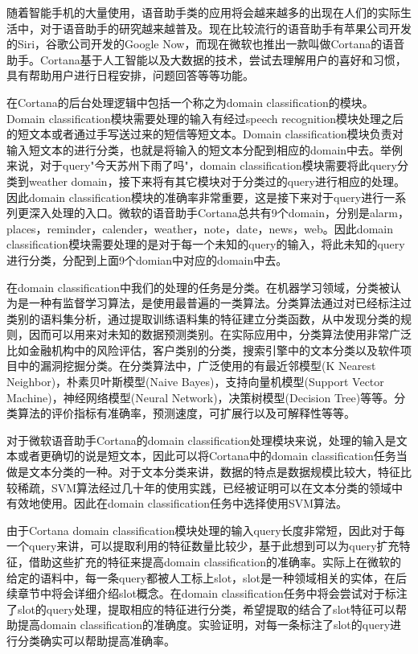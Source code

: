 \documentclass[master]{njuthesis}
\begin{document}
    随着智能手机的大量使用，语音助手类的应用将会越来越多的出现在人们的实际生活中，对于语音助手的研究越来越普及。现在比较流行的语音助手有苹果公司开发的Siri，谷歌公司开发的Google Now，而现在微软也推出一款叫做Cortana的语音助手。Cortana基于人工智能以及大数据的技术，尝试去理解用户的喜好和习惯，具有帮助用户进行日程安排，问题回答等等功能。

    在Cortana的后台处理逻辑中包括一个称之为domain classification的模块。Domain classification模块需要处理的输入有经过speech recognition模块处理之后的短文本或者通过手写送过来的短信等短文本。Domain classification模块负责对输入短文本的进行分类，也就是将输入的短文本分配到相应的domain中去。举例来说，对于query"今天苏州下雨了吗"，domain classification模块需要将此query分类到weather domain，接下来将有其它模块对于分类过的query进行相应的处理。因此domain classification模块的准确率非常重要，这是接下来对于query进行一系列更深入处理的入口。微软的语音助手Cortana总共有9个domain，分别是alarm，places，reminder，calender，weather，note，date，news，web。因此domain classification模块需要处理的是对于每一个未知的query的输入，将此未知的query进行分类，分配到上面9个domian中对应的domain中去。

    在domain classification中我们的处理的任务是分类。在机器学习领域，分类被认为是一种有监督学习算法，是使用最普遍的一类算法。分类算法通过对已经标注过类别的语料集分析，通过提取训练语料集的特征建立分类函数，从中发现分类的规则，因而可以用来对未知的数据预测类别。在实际应用中，分类算法使用非常广泛比如金融机构中的风险评估，客户类别的分类，搜索引擎中的文本分类以及软件项目中的漏洞挖掘分类。在分类算法中，广泛使用的有最近邻模型(K Nearest Neighbor)，朴素贝叶斯模型(Naive Bayes)，支持向量机模型(Support Vector Machine)，神经网络模型(Neural Network)，决策树模型(Decision Tree)等等。分类算法的评价指标有准确率，预测速度，可扩展行以及可解释性等等。
    
    对于微软语音助手Cortana的domain classification处理模块来说，处理的输入是文本或者更确切的说是短文本，因此可以将Cortana中的domain classification任务当做是文本分类的一种。对于文本分类来讲，数据的特点是数据规模比较大，特征比较稀疏，SVM算法经过几十年的使用实践，已经被证明可以在文本分类的领域中有效地使用。因此在domain classification任务中选择使用SVM算法。
    
    由于Cortana domain classification模块处理的输入query长度非常短，因此对于每一个query来讲，可以提取利用的特征数量比较少，基于此想到可以为query扩充特征，借助这些扩充的特征来提高domain classification的准确率。实际上在微软的给定的语料中，每一条query都被人工标上slot，slot是一种领域相关的实体，在后续章节中将会详细介绍slot概念。在domain classification任务中将会尝试对于标注了slot的query处理，提取相应的特征进行分类，希望提取的结合了slot特征可以帮助提高domain classification的准确度。实验证明，对每一条标注了slot的query进行分类确实可以帮助提高准确率。
    
\end{document}
